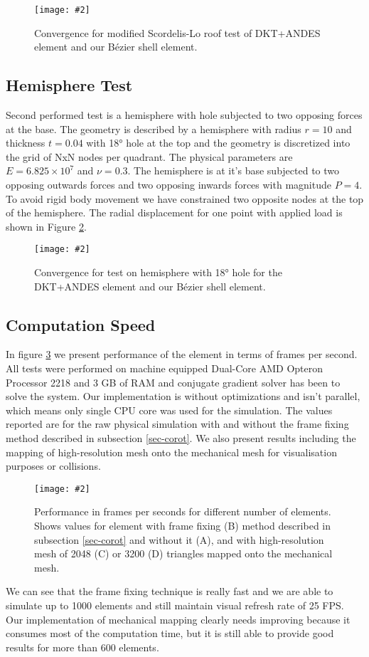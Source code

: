 \documentclass{egpubl}
\newcommand{\Figure}[3]{%
\begin{figure}[htb]
  \centering
  \texttt{[image: \#2]}
  \caption{\label{fig-#2}#3}
\end{figure}}
\begin{document}
\Figure{\linewidth}{roof}
{Convergence for modified Scordelis-Lo roof test of DKT+ANDES element and
our Bézier shell element.}


\subsection{Hemisphere Test}

Second performed test is a hemisphere with hole subjected to two opposing
forces at the base. The geometry is described by a hemisphere with radius
$r=10$ and thickness $t=0.04$ with 18° hole at the top and the geometry is
discretized into the grid of NxN nodes per quadrant. The physical
parameters are $E = 6.825 \times 10^7$ and $\nu = 0.3$. The hemisphere is
at it's base subjected to two opposing outwards forces and two opposing
inwards forces with magnitude $P = 4$. To avoid rigid body movement we have
constrained two opposite nodes at the top of the hemisphere. The radial
displacement for one point with applied load is shown in Figure
\ref{fig-hemisphere}.

\Figure{\linewidth}{hemisphere}
{Convergence for test on hemisphere with 18° hole for the DKT+ANDES element and
our Bézier shell element.}

\subsection{Computation Speed}

In figure \ref{fig-fps} we present performance of the element in terms of
frames per second. All tests were performed on machine equipped Dual-Core
AMD Opteron Processor 2218 and 3 GB of RAM and conjugate gradient solver
has been to solve the system. Our implementation is without optimizations
and isn't parallel, which means only single CPU core was used for the
simulation. The values reported are for the raw physical simulation with
and without the frame fixing method described in subsection
\ref{sec-corot}. We also present results including the mapping of
high-resolution mesh onto the mechanical mesh for visualisation purposes or
collisions.

\Figure{\linewidth}{fps}
{Performance in frames per seconds for different number of elements. Shows
values for element with frame fixing (B) method described in subsection
\ref{sec-corot} and without it (A), and with high-resolution mesh of 2048
(C) or 3200 (D) triangles mapped onto the mechanical mesh.}

We can see that the frame fixing technique is really fast and we are able
to simulate up to 1000 elements and still maintain visual refresh rate of
25 FPS. Our implementation of mechanical mapping clearly needs improving
because it consumes most of the computation time, but it is still able to
provide good results for more than 600 elements.
\end{document}
